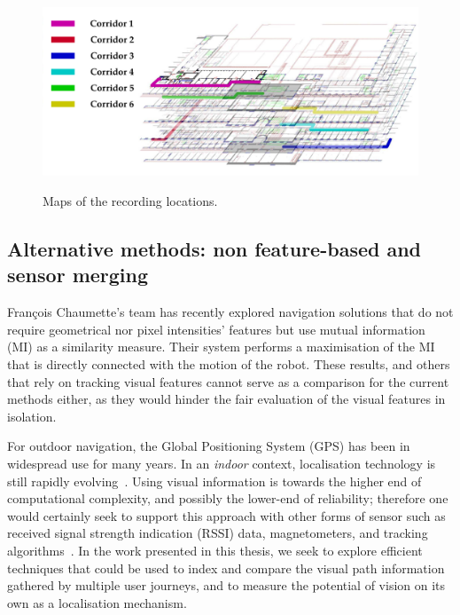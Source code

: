 \begin{figure}[t]
\includegraphics[width=\linewidth]{./gfx/Chapter04/map_and_legend.pdf}\label{fig:visualpathsA}
\caption{Maps of the recording locations.}
\label{fig:map_and_legend}
\end{figure}

\subsection{Alternative methods: non feature-based and sensor merging} 

Fran\c{c}ois Chaumette's team has  recently explored navigation solutions that do not require geometrical nor pixel intensities' features but use mutual information (MI) as a similarity measure. Their system performs a maximisation of the MI that is directly connected with the motion of the robot. These results, and others that rely on tracking visual features \cite{Se2002} cannot serve as a comparison for the current methods either, as they would hinder the fair evaluation of the visual features in isolation.

For outdoor navigation, the Global Positioning System (GPS) has been in widespread use for many years.  In an \textit{indoor} context, localisation technology is still rapidly evolving~\cite{Shen,Wang2012,Quigley2010}.  Using visual information is towards the higher end of computational complexity, and possibly the lower-end of reliability; therefore one would certainly seek to support this approach with other forms of sensor such as received signal strength indication (RSSI) data, magnetometers, and tracking algorithms~\cite{Schroth2011,Schroth2012,Quigley2010}.  In the work presented in this thesis, we seek to explore efficient techniques that could be used to index and compare the visual path information gathered by multiple user journeys, and to measure the potential of vision on its own as a localisation mechanism. 
%

